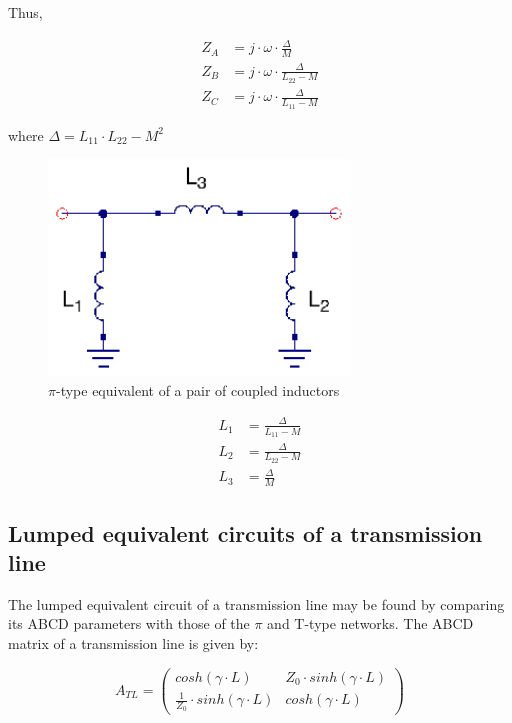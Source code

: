 \noindent Thus,

\begin{align}
   Z_A &= j \cdot \omega \cdot \frac{\Delta}{M} \\
   Z_B &= j \cdot \omega \cdot \frac{\Delta}{L_{22} - M} \\
   Z_C &= j \cdot \omega \cdot \frac{\Delta}{L_{11} - M}
\end{align}

\noindent where $\Delta = L_{11} \cdot L_{22} - M^2$

\begin{figure}[H]
\centering
\includegraphics[width=80mm]{coupled-inductors-pi-equivalent}
\caption{$\pi$-type equivalent of a pair of coupled inductors}
\label{fig:pi-type-coupled-inductor-equivalent}
\end{figure}


\begin{align}
   L_1 &= \frac{\Delta}{L_{11} - M} \\
   L_2 &= \frac{\Delta}{L_{22} - M} \\
   L_3 &= \frac{\Delta}{M}
\end{align}

\subsection{Lumped equivalent circuits of a transmission line}

\noindent The lumped equivalent circuit of a transmission line may be found by comparing its ABCD parameters with those of the $\pi$ and T-type networks. The ABCD matrix of a transmission line is given by:

\begin{equation}
A_{TL} = \begin{pmatrix}
    cosh(\gamma \cdot L)       & Z_0 \cdot sinh(\gamma \cdot L) \\
    \frac{1}{Z_0} \cdot sinh(\gamma \cdot L) & cosh(\gamma \cdot L)
\end{pmatrix}
\end{equation}

